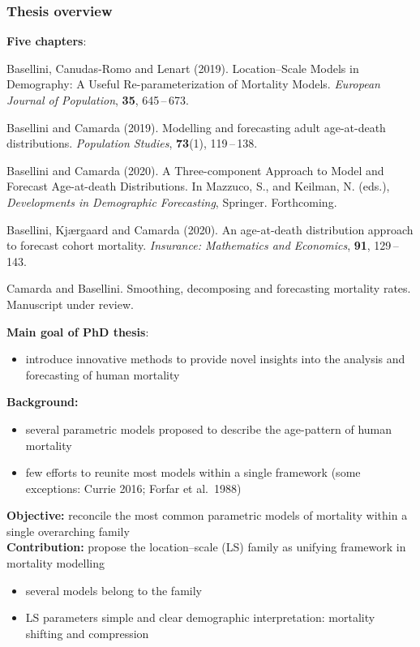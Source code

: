 \documentclass[12pt, xcolor=table]{beamer}  %
\begin{document}
\begin{frame}[plain]\frametitle{Thesis overview}
	\textbf{Five chapters}: 
	\begin{itemize}
		\scriptsize	
		\item Basellini, Canudas-Romo and Lenart (2019). Location--Scale Models in Demography: A Useful Re-parameterization of Mortality Models. {\it European Journal of Population}, {\bf 35}, 645\,--\,673.
		
		\item { Basellini and Camarda (2019). Modelling and forecasting adult age-at-death distributions. {\it Population Studies}, {\bf 73}(1), 119\,--\,138.
		
		\item Basellini and Camarda (2020). A Three-component Approach to Model and Forecast Age-at-death Distributions. In Mazzuco, S., and Keilman, N. (eds.), {\it Developments in Demographic Forecasting}, Springer. Forthcoming.
		
		\item Basellini, Kj{\ae}rgaard and Camarda (2020). An age-at-death distribution approach \\ to forecast cohort mortality. {\it Insurance: Mathematics and Economics}, {\bf 91}, 129\,--\,143.	
		
		\item Camarda and Basellini. Smoothing, decomposing and forecasting mortality rates. Manuscript under review. }	
	\end{itemize}
	\bigskip
	{\pgfsetfillopacity{1} 
	\textbf{Main goal of PhD thesis}: 
	\begin{itemize}
		\item introduce innovative methods to provide novel insights into the analysis and forecasting of human mortality	
	\end{itemize}
}
\end{frame}


\begin{frame} %
\textbf{Background:}
\begin{itemize}
\setlength\itemsep{0.5em}
\item several parametric models proposed to describe the age-pattern of human mortality $\,$ 
\item few efforts to reunite most models within a single framework \scriptsize{(some exceptions: Currie 2016; Forfar et al.~1988)}
\end{itemize}
\bigskip \pause
\textbf{Objective:} reconcile the most common parametric models of mortality within a single overarching family \\
\bigskip \pause
\textbf{Contribution:} propose the location--scale (LS) family as unifying framework in mortality modelling
\begin{itemize}
\setlength\itemsep{0.5em}
\item several models belong to the family 
\item LS parameters simple and clear demographic interpretation: mortality shifting and compression
\end{itemize}

\end{frame}
\end{document}
